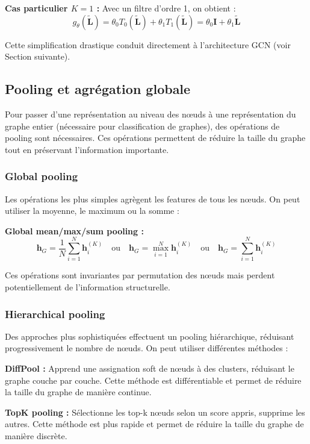 \textbf{Cas particulier $K=1$ :}
Avec un filtre d'ordre 1, on obtient :
\[
g_\theta(\tilde{\mathbf{L}}) = \theta_0 T_0(\tilde{\mathbf{L}}) + \theta_1 T_1(\tilde{\mathbf{L}}) = \theta_0 \mathbf{I} + \theta_1 \tilde{\mathbf{L}}
\]

Cette simplification drastique conduit directement à l'architecture GCN (voir Section suivante).

\subsection{Pooling et agrégation globale}

Pour passer d'une représentation au niveau des nœuds à une représentation du graphe entier (nécessaire pour classification de graphes), des opérations de pooling sont nécessaires. Ces opérations permettent de réduire la taille du graphe tout en préservant l'information importante.

\subsubsection{Global pooling}

Les opérations les plus simples agrègent les features de tous les nœuds. On peut utiliser la moyenne, le maximum ou la somme :

\textbf{Global mean/max/sum pooling :}
\[
\mathbf{h}_G = \frac{1}{N}\sum_{i=1}^N \mathbf{h}_i^{(K)} \quad \text{ou} \quad \mathbf{h}_G = \max_{i=1}^N \mathbf{h}_i^{(K)} \quad \text{ou} \quad \mathbf{h}_G = \sum_{i=1}^N \mathbf{h}_i^{(K)}
\]

Ces opérations sont invariantes par permutation des nœuds mais perdent potentiellement de l'information structurelle.

\subsubsection{Hierarchical pooling}

Des approches plus sophistiquées effectuent un pooling hiérarchique, réduisant progressivement le nombre de nœuds. On peut utiliser différentes méthodes :

\textbf{DiffPool :}
Apprend une assignation soft de nœuds à des clusters, réduisant le graphe couche par couche. Cette méthode est différentiable et permet de réduire la taille du graphe de manière continue.

\textbf{TopK pooling :}
Sélectionne les top-k nœuds selon un score appris, supprime les autres. Cette méthode est plus rapide et permet de réduire la taille du graphe de manière discrète.

